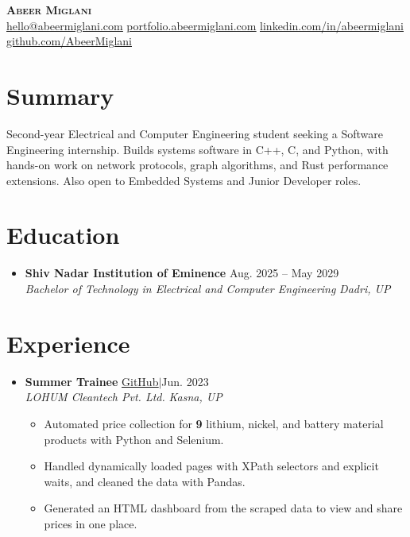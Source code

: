 \documentclass[letterpaper,11pt]{article}
\newcommand{\metric}[1]{\textbf{#1}}
\newcommand{\ulink}[2]{\href{#1}{\underline{#2\vphantom{/}}}}
\newcommand{\repo}[1]{\ulink{https://github.com/AbeerMiglani/#1}{GitHub}\enspace$|$\enspace}
\newcommand{\smallbullet}{$\vcenter{\hbox{\tiny$\bullet$}}$}
\newcommand{\resumeItem}[1]{
  \item\small{
    {#1 \vspace{-2pt}}
  }
}
\newcommand{\resumeSubheading}[4]{
  \vspace{-2pt}\item
    \textbf{#1} \hfill #2 \\
    \textit{\small #3} \hfill \textit{\small #4}%
  \vspace{-5pt}
}
\newcommand{\resumeSubHeadingListStart}{\begin{itemize}[leftmargin=0.15in, label={}]}
\newcommand{\resumeSubHeadingListEnd}{\end{itemize}}
\newcommand{\resumeItemListStart}{\begin{itemize}[leftmargin=0.2in, label={\smallbullet}]}
\newcommand{\resumeItemListEnd}{\end{itemize}\vspace{-5pt}}
\begin{document}
\begin{center}
    \textbf{\Huge \scshape Abeer Miglani} \\ \vspace{3pt}
    \small \ulink{mailto:hello@abeermiglani.com}{hello@abeermiglani.com} \quad
    \ulink{https://portfolio.abeermiglani.com}{portfolio.abeermiglani.com} \quad
    \ulink{https://linkedin.com/in/abeermiglani}{linkedin.com/in/abeermiglani} \quad
    \ulink{https://github.com/AbeerMiglani}{github.com/AbeerMiglani}
\end{center}

\section{Summary}
\small{Second-year Electrical and Computer Engineering student seeking a Software Engineering internship. Builds systems software in C++, C, and Python, with hands-on work on network protocols, graph algorithms, and Rust performance extensions. Also open to Embedded Systems and Junior Developer roles.}

\section{Education}
\resumeSubHeadingListStart
    \resumeSubheading
      {Shiv Nadar Institution of Eminence}{Aug. 2025 -- May 2029}
      {Bachelor of Technology in Electrical and Computer Engineering}{Dadri, UP}
\resumeSubHeadingListEnd

\section{Experience}
\resumeSubHeadingListStart
    \resumeSubheading
      {Summer Trainee}{\repo{metal-price-scraper}Jun. 2023}
      {LOHUM Cleantech Pvt. Ltd.}{Kasna, UP}
      \resumeItemListStart
        \resumeItem{Automated price collection for \metric{9} lithium, nickel, and battery material products with Python and Selenium.}
        \resumeItem{Handled dynamically loaded pages with XPath selectors and explicit waits, and cleaned the data with Pandas.}
        \resumeItem{Generated an HTML dashboard from the scraped data to view and share prices in one place.}
      \resumeItemListEnd
\resumeSubHeadingListEnd

\end{document}
